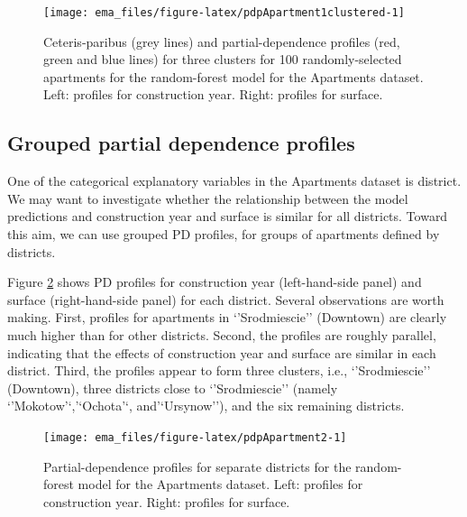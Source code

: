 \documentclass[]{krantz}
\begin{document}
\begin{figure}

{\centering \texttt{[image: ema\_files/figure-latex/pdpApartment1clustered-1]} 

}

\caption{Ceteris-paribus (grey lines) and partial-dependence profiles (red, green and blue lines) for three clusters for 100 randomly-selected apartments for the random-forest model for the Apartments dataset. Left: profiles for construction year. Right: profiles for surface.}\label{fig:pdpApartment1clustered}
\end{figure}

\hypertarget{grouped-partial-dependence-profiles}{%
\subsection{Grouped partial dependence profiles}\label{grouped-partial-dependence-profiles}}

One of the categorical explanatory variables in the Apartments dataset is district. We may want to investigate whether the relationship between the model predictions and construction year and surface is similar for all districts. Toward this aim, we can use grouped PD profiles, for groups of apartments defined by districts.

Figure \ref{fig:pdpApartment2} shows PD profiles for construction year (left-hand-side panel) and surface (right-hand-side panel) for each district. Several observations are worth making. First, profiles for apartments in `'Srodmiescie'' (Downtown) are clearly much higher than for other districts. Second, the profiles are roughly parallel, indicating that the effects of construction year and surface are similar in each district. Third, the profiles appear to form three clusters, i.e., `'Srodmiescie'' (Downtown), three districts close to `'Srodmiescie'' (namely `'Mokotow'`,'`Ochota'`, and'`Ursynow''), and the six remaining districts.

\begin{figure}

{\centering \texttt{[image: ema\_files/figure-latex/pdpApartment2-1]} 

}

\caption{Partial-dependence profiles for separate districts for the random-forest model for the Apartments dataset. Left: profiles for construction year. Right: profiles for surface.}\label{fig:pdpApartment2}
\end{figure}
\end{document}
